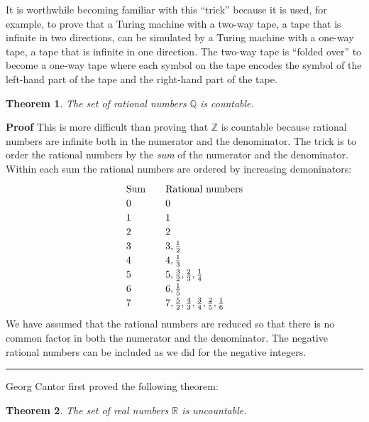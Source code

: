 \documentclass[12pt,a4paper]{article}
\newtheorem{theorem}{Theorem}
\newcommand*{\qed}{\hfill\rule[-2pt]{4pt}{10pt}}
\newenvironment{proof}{\textbf{Proof}}{\qed}
\begin{document}
It is worthwhile becoming familiar with this ``trick'' because it is used, for example, to prove that a Turing machine with a two-way tape, a tape that is infinite in two directions, can be simulated by a Turing machine with a one-way tape, a tape that is infinite in one direction. The two-way tape is ``folded over'' to become a one-way tape where each symbol on the tape encodes the symbol of the left-hand part of the tape and the right-hand part of the tape.

\begin{theorem}
The set of rational numbers $\mathbb{Q}$ is countable.
\end{theorem}
\begin{proof}
This is more difficult than proving that $\mathbb{Z}$ is countable because rational numbers are infinite both in the numerator and the denominator. The trick is to order the rational numbers by the \emph{sum} of the numerator and the denominator. Within each sum the rational numbers are ordered by increasing demoninators:
\[
\renewcommand{\arraystretch}{1.2}
\begin{array}{l@{\hspace{2em}}l}
\textrm{Sum}&\textrm{Rational numbers}\\
0 & 0\\
1 & 1\\
2 & 2\\
3& 3, \frac{1}{2}\\
4& 4, \frac{1}{3}\\
5 & 5, \frac{3}{2},\frac{2}{3}, \frac{1}{4}\\
6 & 6, \frac{1}{5}\\
7 & 7, \frac{5}{2},\frac{4}{3},\frac{3}{4},\frac{2}{5},\frac{1}{6}
\end{array}
\]
We have assumed that the rational numbers are reduced so that there is no common factor in both the numerator and the denominator. The negative rational numbers can be included as we did for the negative integers.
\end{proof}

Georg Cantor first proved the following theorem:

\begin{theorem}
The set of real numbers $\mathbb{R}$ is uncountable.
\end{theorem}
\end{document}
